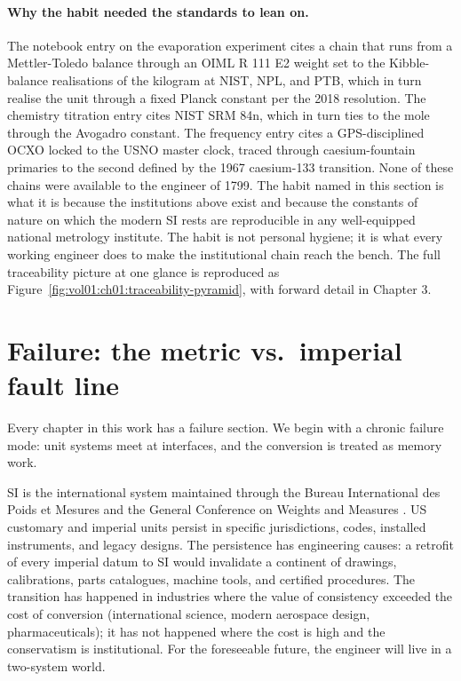 \paragraph{Why the habit needed the standards to lean on.}

The notebook entry on the evaporation experiment cites a chain that
runs from a Mettler-Toledo balance through an OIML R 111 E2 weight
set to the Kibble-balance realisations of the kilogram at NIST, NPL,
and PTB, which in turn realise the unit through a fixed Planck
constant per the 2018 resolution. The chemistry titration entry
cites NIST SRM 84n, which in turn ties to the mole through the
Avogadro constant. The frequency entry cites a GPS-disciplined OCXO
locked to the USNO master clock, traced through caesium-fountain
primaries to the second defined by the 1967 caesium-133 transition.
None of these chains were available to the engineer of 1799. The
habit named in this section is what it is because the institutions
above exist and because the constants of nature on which the modern
SI rests are reproducible in any well-equipped national metrology
institute. The habit is not personal hygiene; it is what every
working engineer does to make the institutional chain reach the
bench. The full traceability picture at one glance is reproduced as
Figure~\ref{fig:vol01:ch01:traceability-pyramid}, with forward
detail in Chapter 3.



\section{Failure: the metric vs.\ imperial fault line}

Every chapter in this work has a failure section. We begin with a
chronic failure mode: unit systems meet at interfaces, and the
conversion is treated as memory work.

SI is the international system maintained through the Bureau
International des Poids et Mesures and the General Conference on
Weights and Measures \cite{std:bipm-si2019}. US customary and
imperial units persist in specific jurisdictions, codes, installed
instruments, and legacy designs. The persistence has engineering
causes: a retrofit of every imperial datum to SI would invalidate a
continent of drawings, calibrations, parts catalogues, machine tools,
and certified procedures. The transition has happened in industries
where the value of consistency exceeded the cost of conversion
(international science, modern aerospace design, pharmaceuticals);
it has not happened where the cost is high and the conservatism is
institutional. For the foreseeable future, the engineer will live in
a two-system world.

